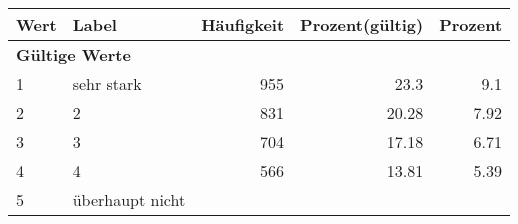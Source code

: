      \begin{longtable}{lXrrr}
     \toprule
     \textbf{Wert} & \textbf{Label} & \textbf{Häufigkeit} & \textbf{Prozent(gültig)} & \textbf{Prozent} \\
     \endhead
     \midrule
     \multicolumn{5}{l}{\textbf{Gültige Werte}}\\

     1 &
     \multicolumn{1}{X}{ sehr stark   } &


       \num{955} &
       \num[round-mode=places,round-precision=2]{23,3} &
         \num[round-mode=places,round-precision=2]{9,1} \\

     2 &
     \multicolumn{1}{X}{ 2   } &


       \num{831} &
       \num[round-mode=places,round-precision=2]{20,28} &
         \num[round-mode=places,round-precision=2]{7,92} \\

     3 &
     \multicolumn{1}{X}{ 3   } &


       \num{704} &
       \num[round-mode=places,round-precision=2]{17,18} &
         \num[round-mode=places,round-precision=2]{6,71} \\

     4 &
     \multicolumn{1}{X}{ 4   } &


       \num{566} &
       \num[round-mode=places,round-precision=2]{13,81} &
         \num[round-mode=places,round-precision=2]{5,39} \\

     5 &
     \multicolumn{1}{X}{ überhaupt nicht   } &



\end{longtable}
